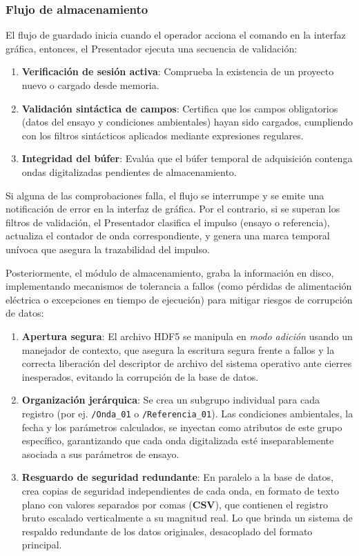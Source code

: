 \subsubsection{Flujo de almacenamiento}
\label{subsubsec:flujo_almacenamiento}

El flujo de guardado inicia cuando el operador acciona el comando en la interfaz gráfica, entonces, el Presentador ejecuta una secuencia de validación:
\begin{enumerate}
    \item \textbf{Verificación de sesión activa}: Comprueba la existencia de un proyecto nuevo o cargado desde memoria.
    \item \textbf{Validación sintáctica de campos}: Certifica que los campos obligatorios (datos del ensayo y condiciones ambientales) hayan sido cargados, cumpliendo con los filtros sintácticos aplicados mediante expresiones regulares.
    \item \textbf{Integridad del búfer}: Evalúa que el búfer temporal de adquisición contenga ondas digitalizadas pendientes de almacenamiento.
\end{enumerate}

Si alguna de las comprobaciones falla, el flujo se interrumpe y se emite una notificación de error en la interfaz de gráfica. Por el contrario, si se superan los filtros de validación, el Presentador clasifica el impulso (ensayo o referencia), actualiza el contador de onda correspondiente, y genera una marca temporal unívoca que asegura la trazabilidad del impulso.

Posteriormente, el módulo de almacenamiento, graba la información en disco, implementando mecanismos de tolerancia a fallos (como pérdidas de alimentación eléctrica o excepciones en tiempo de ejecución) para mitigar riesgos de corrupción de datos:

\begin{enumerate}
    \item \textbf{Apertura segura}: El archivo HDF5 se manipula en \emph{modo adición} usando un manejador de contexto, que asegura la
    escritura segura frente a fallos y la correcta liberación del descriptor de archivo del sistema operativo ante cierres inesperados, evitando la corrupción de la base de datos.
    \item \textbf{Organización jerárquica}: Se crea un subgrupo individual para cada registro (por ej. \texttt{/Onda\_01} o \texttt{/Referencia\_01}). Las condiciones ambientales, la fecha y los parámetros calculados, se inyectan como atributos de este grupo específico, garantizando que cada onda digitalizada esté inseparablemente asociada a sus parámetros de ensayo.
    \item \textbf{Resguardo de seguridad redundante}: En paralelo a la base de datos, crea copias de seguridad independientes de cada onda, en formato de texto plano con valores separados por comas (\textbf{CSV}), que contienen el registro bruto escalado verticalmente a su magnitud real. Lo que brinda un sistema de respaldo redundante de los datos originales, desacoplado del formato principal.
\end{enumerate}

